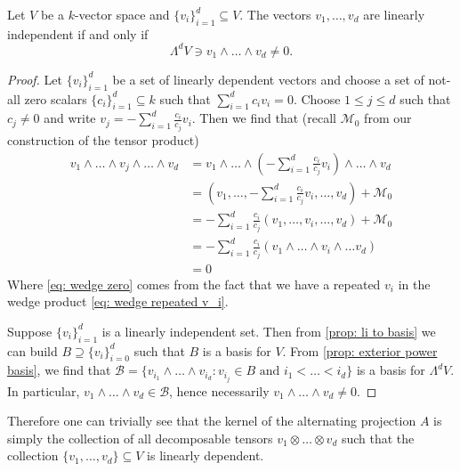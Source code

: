 \begin{proposition}\label{prop: li iff wedge nonzero}
Let \(V\) be a \(k\)-vector space and \(\{v_i\}_{i=1}^d \subseteq V\). The
vectors \(v_1, \dots, v_d\) are linearly independent if and only if
\[
  \Lambda^d V \ni v_1 \wedge \dots \wedge v_d \neq 0.
\]
\end{proposition}

\begin{proof}
Let \(\{v_i\}_{i=1}^d\) be a set of linearly dependent vectors and choose
a set of not-all zero scalars \(\{c_i\}_{i=1}^d \subseteq k\) such that
\(\sum_{i=1}^d c_i v_i = 0\). Choose \(1 \leq j \leq d\) such that \(c_j
\neq 0\) and write \(v_j = -\sum_{i=1}^d \frac{c_i}{c_j} v_i\). Then we find
that (recall \(\mathcal M_0\) from our construction of the tensor product)
\begin{align}
  \nonumber
  v_1 \wedge \dots \wedge v_j \wedge \dots \wedge v_d
  &= v_1 \wedge \dots \wedge \left( - \sum_{i=1}^d \frac{c_i}{c_j} v_i \right)
  \wedge \dots \wedge v_d
  \\
  \nonumber
  &= \left( v_1, \dots, - \sum_{i=1}^d \frac{c_i}{c_j} v_i, \dots, v_d \right)
  + \mathcal M_0 \\
  &= -\sum_{i=1}^d \frac{c_i}{c_j} (v_1, \dots, v_i, \dots, v_d) + \mathcal
  M_0
  \\
  \label{eq: wedge repeated v_i}
  &= - \sum_{i=1}^d \frac{c_i}{c_j} (v_1 \wedge \dots \wedge v_i \wedge \dots
  v_d)
  \\
  \label{eq: wedge zero}
  &= 0
\end{align}
Where \cref{eq: wedge zero} comes from the fact that we have a
repeated \(v_i\) in the wedge product \cref{eq: wedge repeated v_i}.

Suppose \(\{v_i\}_{i=1}^d\) is a linearly independent set. Then from
\cref{prop: li to basis} we can build \(B \supseteq \{v_i\}_{i=0}^d\) such
that \(B\) is a basis for \(V\). From \cref{prop: exterior power basis}, we
find that \(\mathcal B = \{v_{i_1} \wedge \dots \wedge v_{i_d} \colon v_{i_j} \in B
\text{ and } i_1 < \dots < i_d\}\) is a basis for \(\Lambda^d V\). In
particular, \(v_1 \wedge \dots \wedge v_d \in \mathcal B\), hence necessarily
\(v_1 \wedge \dots \wedge v_d \neq 0\).
\end{proof}

Therefore one can trivially see that the kernel of the alternating projection
\(A\) is simply the collection of all decomposable tensors \(v_1 \otimes \dots
\otimes v_d\) such that the collection \(\{v_{1}, \dots, v_d\} \subseteq V\) is
linearly dependent.

